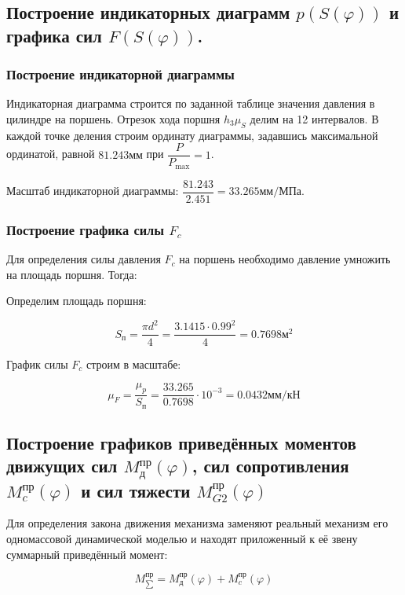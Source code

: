 \subsection{Построение индикаторных диаграмм $p(S(\varphi))$ и графика сил $F(S(\varphi))$.}

\subsubsection{Построение индикаторной диаграммы}
Индикаторная диаграмма строится по заданной таблице значения давления в цилиндре на поршень. Отрезок хода поршня $h_3 \mu_S$ делим на 12 интервалов. В каждой точке деления строим ординату диаграммы, задавшись максимальной ординатой, равной $81.243 мм$ при $ \dfrac{P}{P_{\max}} = 1 $.

Масштаб индикаторной диаграммы: $ \dfrac{81.243}{2.451} = 33.265 мм/МПа$.

\subsubsection{Построение графика силы $F_c$}

Для определения силы давления $F_c$ на поршень необходимо давление умножить на площадь поршня. Тогда:

Определим площадь поршня:

\begin{equation}
	S_п = \dfrac{\pi d^2}{4} = \dfrac{3.1415 \cdot 0.99^2}{4} = 0.7698 м^2
\end{equation}

График силы $F_c$ строим в масштабе:

\begin{equation}
	\mu_F = \dfrac{\mu_p}{S_п} = \dfrac{33.265}{0.7698} \cdot 10^{-3} = 0.0432 мм/кН 
\end{equation}

\subsection{Построение графиков приведённых моментов движущих сил $ M_д^{пр}(\varphi) $, сил сопротивления $ M_c^{пр}(\varphi) $ и сил тяжести $ M_{G2}^{пр}(\varphi) $}

Для определения закона движения механизма заменяют реальный механизм его одномассовой динамической моделью и находят приложенный к её звену суммарный приведённый момент:

\begin{equation}
	M_{\sum}^{пр} =  M_д^{пр}(\varphi) +  M_c^{пр}(\varphi) 
\end{equation}


